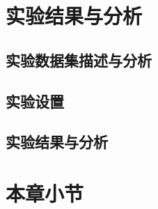 \section{实验结果与分析}

\subsection{实验数据集描述与分析}
\subsection{实验设置}
\subsection{实验结果与分析}

\section{本章小节}





